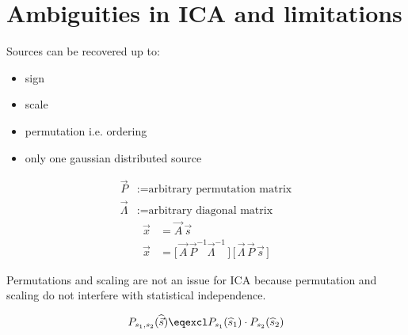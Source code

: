 
\section{Ambiguities in ICA and limitations}
\begin{frame}{\secname}

Sources can be recovered up to:
\begin{itemize}
\item sign
\item scale
\item permutation i.e. ordering
\item only one gaussian distributed source
\end{itemize}
\begin{align*}
\vec P &:= \text{arbitrary permutation matrix}\\
\vec \Lambda &:= \text{arbitrary diagonal matrix}
\end{align*}
\begin{align}
\vec x &= \vec A \, \vec s\\
\vec x &= \lbrack \, \vec A\, \vec P^{-1} \vec \Lambda^{-1}\, \rbrack \, \lbrack \, \vec \Lambda \, \vec P \, \vec s\, \rbrack
\end{align}

\end{frame}


\begin{frame}{\secname}

Permutations and scaling are not an issue for ICA because permutation and scaling do not interfere with statistical independence.

\begin{equation}
P_{s_1, s_2}(\widehat {\vec s}) \eqexcl  P_{s_1} (\widehat{s}_1) \cdot P_{s_2} (\widehat{s}_2)
\end{equation}


\end{frame}

